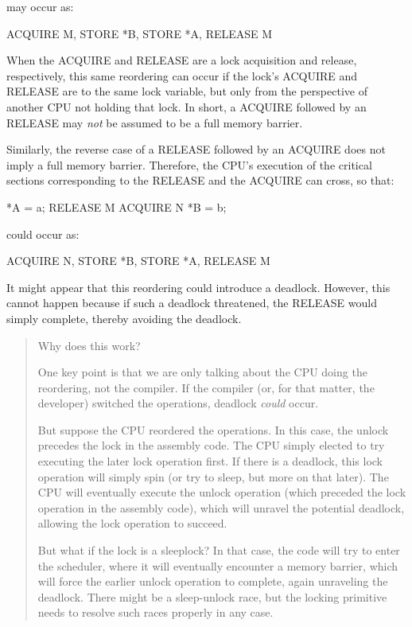 may occur as:

\begin{VerbatimU}
	ACQUIRE M, STORE *B, STORE *A, RELEASE M
\end{VerbatimU}

When the ACQUIRE and RELEASE are a lock acquisition and release,
respectively, this same reordering can occur if the lock's ACQUIRE and
RELEASE are to the same lock variable, but only from the perspective of
another CPU not holding that lock.
In short, a ACQUIRE followed by an RELEASE may \emph{not} be assumed to
be a full memory barrier.

Similarly, the reverse case of a RELEASE followed by an ACQUIRE does
not imply a full memory barrier.
Therefore, the CPU's execution of the critical sections corresponding
to the RELEASE and the ACQUIRE can cross, so that:

\begin{VerbatimU}
	*A = a;
	RELEASE M
	ACQUIRE N
	*B = b;
\end{VerbatimU}

could occur as:

\begin{VerbatimU}
	ACQUIRE N, STORE *B, STORE *A, RELEASE M
\end{VerbatimU}

It might appear that this reordering could introduce a deadlock.
However, this cannot happen because if such a deadlock threatened,
the RELEASE would simply complete, thereby avoiding the deadlock.

\begin{quote}
	Why does this work?

	One key point is that we are only talking about the CPU doing
	the reordering, not the compiler.
	If the compiler (or, for that matter, the developer) switched
	the operations, deadlock \emph{could} occur.

	But suppose the CPU reordered the operations.
	In this case, the unlock precedes the lock in the assembly code.
	The CPU simply elected to try executing the later lock operation
	first.
	If there is a deadlock, this lock operation will simply spin (or
	try to sleep, but more on that later).
	The CPU will eventually execute the unlock operation (which
	preceded the lock operation in the assembly code), which will
	unravel the potential deadlock, allowing the lock operation to
	succeed.

	But what if the lock is a sleeplock?
	In that case, the code will try to enter the scheduler, where it
	will eventually encounter a memory barrier, which will force the
	earlier unlock operation to complete, again unraveling the deadlock.
	There might be a sleep-unlock race, but the locking primitive
	needs to resolve such races properly in any case.

\end{quote}

